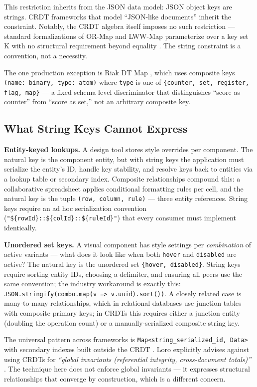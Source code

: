 This restriction inherits from the JSON data model: JSON object keys are strings. CRDT frameworks that model ``JSON-like documents'' inherit the constraint. Notably, the CRDT algebra itself imposes no such restriction --- standard formalizations of OR-Map and LWW-Map parameterize over a key set K with no structural requirement beyond equality \cite{baquero2017pure, shapiro2011crdt}. The string constraint is a convention, not a necessity.

The one production exception is Riak DT Map \cite{riakdtmap}, which uses composite keys \texttt{(name: binary, type: atom)} where \texttt{type} is one of \texttt{\{counter, set, register, flag, map\}} --- a fixed schema-level discriminator that distinguishes ``score as counter'' from ``score as set,'' not an arbitrary composite key.

\subsection{What String Keys Cannot Express}

\textbf{Entity-keyed lookups.} A design tool stores style overrides per component. The natural key is the component entity, but with string keys the application must serialize the entity's ID, handle key stability, and resolve keys back to entities via a lookup table or secondary index. Composite relationships compound this: a collaborative spreadsheet applies conditional formatting rules per cell, and the natural key is the tuple \texttt{(row, column, rule)} --- three entity references. String keys require an ad hoc serialization convention (\texttt{"\$\{rowId\}::\$\{colId\}::\$\{ruleId\}"}) that every consumer must implement identically.

\textbf{Unordered set keys.} A visual component has style settings per \emph{combination} of active variants --- what does it look like when both \texttt{hover} and \texttt{disabled} are active? The natural key is the unordered set \texttt{\{hover, disabled\}}. String keys require sorting entity IDs, choosing a delimiter, and ensuring all peers use the same convention; the industry workaround is exactly this: \texttt{JSON.stringify(combo.map(v =\textgreater{} v.uuid).sort())}. A closely related case is many-to-many relationships, which in relational databases use junction tables with composite primary keys; in CRDTs this requires either a junction entity (doubling the operation count) or a manually-serialized composite string key.

The universal pattern across frameworks is \texttt{Map\textless{}string\_serialized\_id, Data\textgreater{}} with secondary indexes built outside the CRDT \cite{automerge:modeling}. Loro explicitly advises against using CRDTs for \emph{``global invariants (referential integrity, cross-document totals)''} \cite{loro:whennot}. The technique here does not enforce global invariants --- it expresses structural relationships that converge by construction, which is a different concern.


